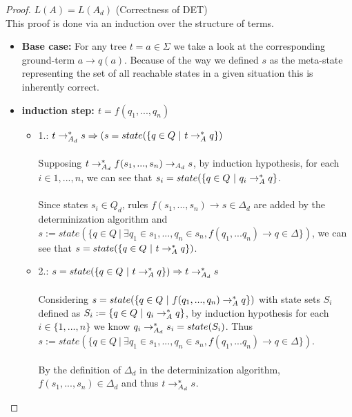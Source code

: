 \documentclass{llncs}
\begin{document}
\begin{proof}{\(L(A) = L(A_d)\) (Correctness of DET) \cite{tata-nfta}}\\
	This proof is done via an induction over the structure of terms.
	\begin{itemize}
		\item \textbf{Base case:}
			For any tree \(t = a \in \Sigma\) we take a look at the corresponding ground-term \(a \rightarrow q(a)\). Because of the way we defined \(s\) as the meta-state representing the set of all reachable states in a given situation this is inherently correct.
			\\
		\item \textbf{induction step: \(t = f(q_1,... , q_n)\)}
			\begin{itemize}
				\item 
				1.: \(t \rightarrow_{A_d}^* s \Rightarrow (s = state(\{q \in Q ~|~ t \rightarrow_A^* q\})\)\\\\
				Supposing \(t \rightarrow_{A_d}^* f(s_1, ..., s_n) \rightarrow_{A_d} s\), by induction hypothesis, for each \(i \in {1,..., n}\), we can see that \(s_i = state(\{q \in Q ~|~ q_i \rightarrow_A^* q\}\).\\
				\\
				Since states \(s_i \in Q_d\), rules \(f(s_1, ..., s_n) \rightarrow s \in \Delta_d\) are added by the determinization algorithm and \( s := state(\{ q \in Q ~|~ \exists q_1 \in s_1,..., q_n \in s_n, f(q_1,...q_n) \rightarrow q \in \Delta \}) \), we can see that	\(s = state(\{q \in Q ~|~ t \rightarrow_A^* q\})\).
				\\
				\item
				2.: \(s = state(\{q \in Q ~|~ t \rightarrow_A^* q\}) \Rightarrow t \rightarrow_{A_d}^* s\)\\\\
				Considering \(s = state(\{q \in Q ~|~ f(q_1, ..., q_n) \rightarrow_A^* q\})\) with state sets \(S_i\) defined as \(S_i := \{q \in Q ~|~ q_i \rightarrow_A^* q\}\), by induction hypothesis for each \(i \in \{1, ..., n\}\) we know \(q_i \rightarrow_{A_d}^* s_i = state(S_i)\).
				Thus \( s := state(\{ q \in Q ~|~ \exists q_1 \in s_1,..., q_n \in s_n, f(q_1,...q_n) \rightarrow q \in \Delta \}) \).\\
				\\
				By the definition of \(\Delta_d\) in the determinization algorithm, \(f(s_1, ..., s_n) \in \Delta_d\) and thus \(t \rightarrow_{A_d}^* s\).
			\end{itemize}
	\end{itemize}
	
\end{proof}
\end{document}
